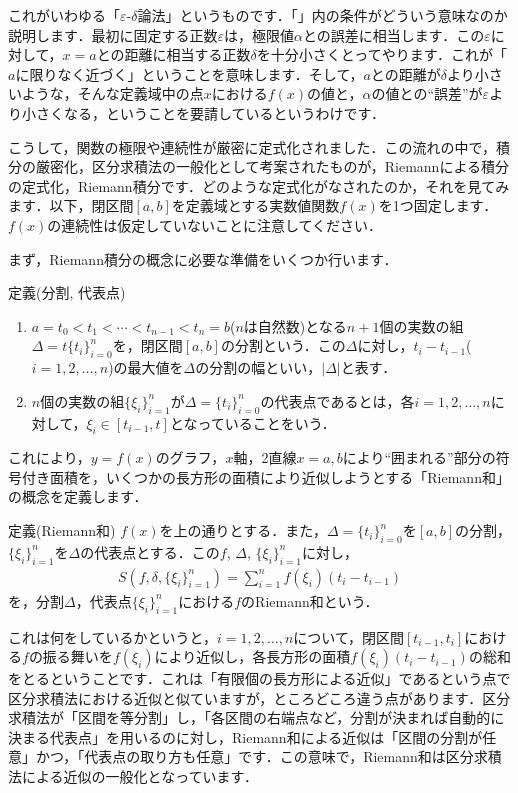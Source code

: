 \par これがいわゆる「$\varepsilon$-$\delta$論法」というものです．「」内の条件がどういう意味なのか説明します．最初に固定する正数$\varepsilon$は，極限値$\alpha$との誤差に相当します．この$\varepsilon$に対して，$x=a$との距離に相当する正数$\delta$を十分小さくとってやります．これが「$a$に限りなく近づく」ということを意味します．そして，$a$との距離が$\delta$より小さいような，そんな定義域中の点$x$における$f(x)$の値と，$\alpha$の値との“誤差”が$\varepsilon$より小さくなる，ということを要請しているというわけです．
\par こうして，関数の極限や連続性が厳密に定式化されました．この流れの中で，積分の厳密化，区分求積法の一般化として考案されたものが，Riemannによる積分の定式化，Riemann積分です．どのような定式化がなされたのか，それを見てみます．以下，閉区間$[a, b]$を定義域とする実数値関数$f(x)$を1つ固定します．$f(x)$の連続性は仮定していないことに注意してください．
\par まず，Riemann積分の概念に必要な準備をいくつか行います．
\begin{itembox}[l]{定義(分割, 代表点)}
\begin{enumerate}
\item $a=t_0<t_1<\cdots<t_{n-1}<t_n=b$($n$は自然数)となる$n+1$個の実数の組$\Delta=t\{t_i\}_{i=0}^{n}$を，閉区間$[a,b]$の分割という．この$\Delta $に対し，$t_i-t_{i-1}$($i=1,2,\ldots,n$)の最大値を$\Delta$の分割の幅といい，$\left|\Delta\right|$と表す．
\item $n$個の実数の組$\{\xi _i\}_{i=1}^{n}$が$\Delta=\{t_i\}_{i=0}^{n}$の代表点であるとは，各$i=1,2,\ldots,n$に対して，$\xi _i \in [t_{i-1},t]$となっていることをいう．
\end{enumerate}
\end{itembox}
これにより，$y=f(x)$のグラフ，$x$軸，2直線$x=a,b$により“囲まれる”部分の符号付き面積を，いくつかの長方形の面積により近似しようとする「Riemann和」の概念を定義します．
\begin{itembox}[l]{定義(Riemann和)}
$f(x)$を上の通りとする．また，$\Delta=\{t_i\}_{i=0}^{n}$を$[a,b]$の分割，$\{\xi _i\}_{i=1}^{n}$を$\Delta$の代表点とする．この$f$, $\Delta$, $\{\xi _i\}_{i=1}^{n}$に対し，
\begin{eqnarray}
S\left(f,\delta,\{\xi _i\}_{i=1}^{n}\right)=\sum_{i=1}^{n}f\left(\xi_{i} \right)(t_i - t_{i-1}) \nonumber
\end{eqnarray}
を，分割$\Delta$，代表点$\{\xi _i\}_{i=1}^{n}$における$f$のRiemann和という．
\end{itembox}
\par これは何をしているかというと，$i=1,2,\ldots,n$について，閉区間$[t_{i-1},t_i]$における$f$の振る舞いを$f\left(\xi_i\right)$により近似し，各長方形の面積$f\left(\xi_{i} \right)(t_i - t_{i-1})$の総和をとるということです．これは「有限個の長方形による近似」であるという点で区分求積法における近似と似ていますが，ところどころ違う点があります．区分求積法が「区間を等分割」し，「各区間の右端点など，分割が決まれば自動的に決まる代表点」を用いるのに対し，Riemann和による近似は「区間の分割が任意」かつ，「代表点の取り方も任意」です．この意味で，Riemann和は区分求積法による近似の一般化となっています．
